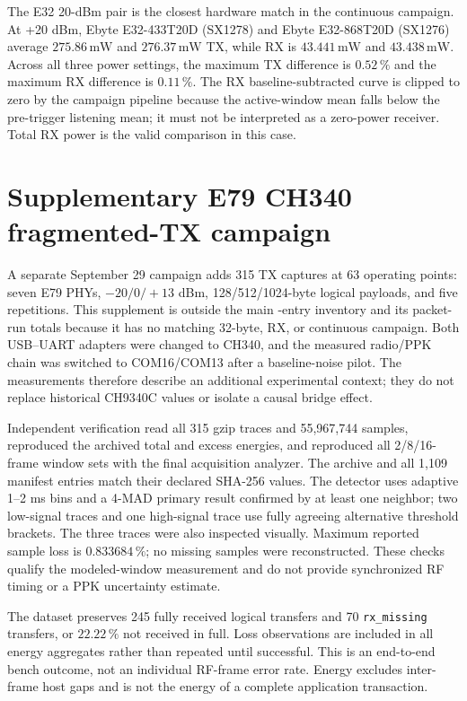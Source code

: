 \documentclass[10pt,a4paper]{article}
\newcommand{\percent}{\%}
\newcommand{\SI}[2]{\ensuremath{#1\,\mathrm{#2}}}
\begin{document}
The E32 20-dBm pair is the closest hardware match in the continuous campaign. At +20 dBm, Ebyte E32-433T20D (SX1278) and Ebyte E32-868T20D (SX1276) average \SI{275.86}{mW} and \SI{276.37}{mW} TX, while RX is \SI{43.441}{mW} and \SI{43.438}{mW}. Across all three power settings, the maximum TX difference is \SI{0.52}{\percent} and the maximum RX difference is \SI{0.11}{\percent}. The RX baseline-subtracted curve is clipped to zero by the campaign pipeline because the active-window mean falls below the pre-trigger listening mean; it must not be interpreted as a zero-power receiver. Total RX power is the valid comparison in this case.

\clearpage
\section{Supplementary E79 CH340 fragmented-TX campaign}
\label{sec:e79-ch340-supplement}

A separate September 29 campaign adds 315 TX captures at 63 operating points: seven E79 PHYs, $-20/0/+13$ dBm, 128/512/1024-byte logical payloads, and five repetitions. This supplement is outside the main \TotalModules{}-entry inventory and its packet-run totals because it has no matching 32-byte, RX, or continuous campaign. Both USB--UART adapters were changed to CH340, and the measured radio/PPK chain was switched to COM16/COM13 after a baseline-noise pilot. The measurements therefore describe an additional experimental context; they do not replace historical CH9340C values or isolate a causal bridge effect.

Independent verification read all 315 gzip traces and 55,967,744 samples, reproduced the archived total and excess energies, and reproduced all 2/8/16-frame window sets with the final acquisition analyzer. The archive and all 1,109 manifest entries match their declared SHA-256 values. The detector uses adaptive 1--2 ms bins and a 4-MAD primary result confirmed by at least one neighbor; two low-signal traces and one high-signal trace use fully agreeing alternative threshold brackets. The three traces were also inspected visually. Maximum reported sample loss is \SI{0.833684}{\percent}; no missing samples were reconstructed. These checks qualify the modeled-window measurement and do not provide synchronized RF timing or a PPK uncertainty estimate.

The dataset preserves 245 fully received logical transfers and 70 \texttt{rx\_missing} transfers, or \SI{22.22}{\percent} not received in full. Loss observations are included in all energy aggregates rather than repeated until successful. This is an end-to-end bench outcome, not an individual RF-frame error rate. Energy excludes inter-frame host gaps and is not the energy of a complete application transaction.
\end{document}
